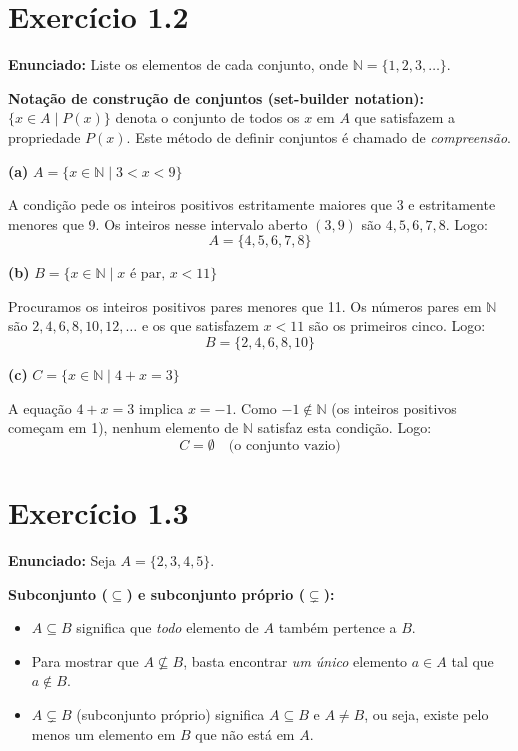\documentclass[12pt,a4paper]{article}
\begin{document}
\section*{Exercício 1.2}

\textbf{Enunciado:} Liste os elementos de cada conjunto, onde $\mathbb{N} = \{1, 2, 3, \ldots\}$.

\begin{teoribox}
\textbf{Notação de construção de conjuntos (set-builder notation):} $\{x \in A \mid P(x)\}$ denota o conjunto de todos os $x$ em $A$ que satisfazem a propriedade $P(x)$. Este método de definir conjuntos é chamado de \emph{compreensão}.
\end{teoribox}

\textbf{(a)} $A = \{x \in \mathbb{N} \mid 3 < x < 9\}$

A condição pede os inteiros positivos estritamente maiores que 3 e estritamente menores que 9. Os inteiros nesse intervalo aberto $(3,9)$ são $4, 5, 6, 7, 8$. Logo:
\[
A = \{4, 5, 6, 7, 8\}
\]

\textbf{(b)} $B = \{x \in \mathbb{N} \mid x \text{ é par},\, x < 11\}$

Procuramos os inteiros positivos pares menores que 11. Os números pares em $\mathbb{N}$ são $2, 4, 6, 8, 10, 12, \ldots$ e os que satisfazem $x < 11$ são os primeiros cinco. Logo:
\[
B = \{2, 4, 6, 8, 10\}
\]

\textbf{(c)} $C = \{x \in \mathbb{N} \mid 4 + x = 3\}$

A equação $4 + x = 3$ implica $x = -1$. Como $-1 \notin \mathbb{N}$ (os inteiros positivos começam em 1), nenhum elemento de $\mathbb{N}$ satisfaz esta condição. Logo:
\[
C = \emptyset \quad \text{(o conjunto vazio)}
\]

\section*{Exercício 1.3}

\textbf{Enunciado:} Seja $A = \{2, 3, 4, 5\}$.

\begin{teoribox}
\textbf{Subconjunto ($\subseteq$) e subconjunto próprio ($\subsetneq$):}
\begin{itemize}
  \item $A \subseteq B$ significa que \emph{todo} elemento de $A$ também pertence a $B$.
  \item Para mostrar que $A \not\subseteq B$, basta encontrar \emph{um único} elemento $a \in A$ tal que $a \notin B$.
  \item $A \subsetneq B$ (subconjunto próprio) significa $A \subseteq B$ e $A \neq B$, ou seja, existe pelo menos um elemento em $B$ que não está em $A$.
\end{itemize}
\end{teoribox}
\end{document}
